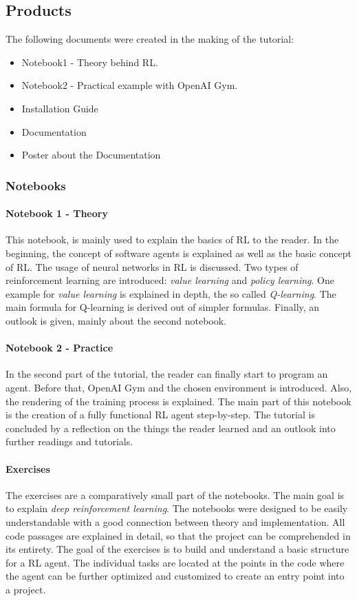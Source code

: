 \documentclass[10pt,a4paper]{article}
\begin{document}
		\subsection{Products}
		The following documents were created in the making of the tutorial:
		\begin{itemize}
			\item Notebook1 - Theory behind RL.
			\item Notebook2 - Practical example with OpenAI Gym.
			\item Installation Guide
			\item Documentation
			\item Poster about the Documentation
		\end{itemize}
		\subsubsection{Notebooks}
		
			\paragraph{Notebook 1 - Theory}
				This notebook, is mainly used to explain the basics of RL to the reader.
				In the beginning, the concept of software agents is explained as well as the basic concept of RL.
				The usage of neural networks in RL is discussed.
				Two types of reinforcement learning are introduced: \textit{value learning} and \textit{policy learning}.
				One example for \textit{value learning} is explained in depth, the so called \textit{Q-learning}. 
				The main formula for Q-learning is derived out of simpler formulas.
				Finally, an outlook is given, mainly about the second notebook.
			\paragraph{Notebook 2 - Practice}
				In the second part of the tutorial, the reader can finally start to program an agent. 
				Before that, OpenAI Gym and the chosen environment is introduced.
				Also, the rendering of the training process is explained.
				The main part of this notebook is the creation of a fully functional RL agent step-by-step.
				The tutorial is concluded by a reflection on the things the reader learned and an outlook into further readings and tutorials.
			\paragraph{Exercises}
			The exercises are a comparatively small part of the notebooks. The main goal is to explain \textit{deep reinforcement learning}. The notebooks were designed to be easily understandable with a good connection between theory and implementation. All code passages are explained in detail, so that the project can be comprehended in its entirety. The goal of the exercises is to build and understand a basic structure for a RL agent. The individual tasks are located at the points in the code where the agent can be further optimized and customized to create an entry point into a project.
\end{document}
